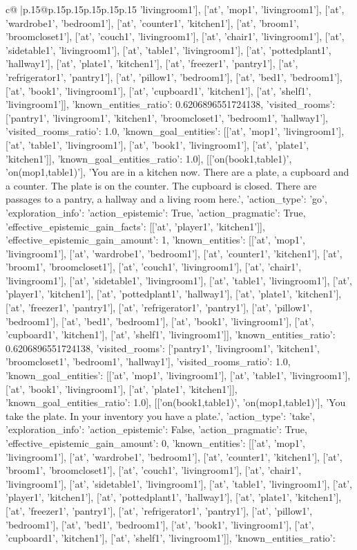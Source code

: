 \documentclass{article}
\begin{document}
{\begin{supertabular}{c@{$\;$}|p{.15\linewidth}@{}p{.15\linewidth}p{.15\linewidth}p{.15\linewidth}p{.15\linewidth}p{.15\linewidth}}
{{{'livingroom1'], ['at', 'mop1', 'livingroom1'], ['at', 'wardrobe1', 'bedroom1'], ['at', 'counter1', 'kitchen1'], ['at', 'broom1', 'broomcloset1'], ['at', 'couch1', 'livingroom1'], ['at', 'chair1', 'livingroom1'], ['at', 'sidetable1', 'livingroom1'], ['at', 'table1', 'livingroom1'], ['at', 'pottedplant1', 'hallway1'], ['at', 'plate1', 'kitchen1'], ['at', 'freezer1', 'pantry1'], ['at', 'refrigerator1', 'pantry1'], ['at', 'pillow1', 'bedroom1'], ['at', 'bed1', 'bedroom1'], ['at', 'book1', 'livingroom1'], ['at', 'cupboard1', 'kitchen1'], ['at', 'shelf1', 'livingroom1']], 'known_entities_ratio': 0.6206896551724138, 'visited_rooms': ['pantry1', 'livingroom1', 'kitchen1', 'broomcloset1', 'bedroom1', 'hallway1'], 'visited_rooms_ratio': 1.0, 'known_goal_entities': [['at', 'mop1', 'livingroom1'], ['at', 'table1', 'livingroom1'], ['at', 'book1', 'livingroom1'], ['at', 'plate1', 'kitchen1']], 'known_goal_entities_ratio': 1.0}}], [['on(book1,table1)', 'on(mop1,table1)'], 'You are in a kitchen now. There are a plate, a cupboard and a counter. The plate is on the counter. The cupboard is closed. There are passages to a pantry, a hallway and a living room here.', {'action_type': 'go', 'exploration_info': {'action_epistemic': True, 'action_pragmatic': True, 'effective_epistemic_gain_facts': [['at', 'player1', 'kitchen1']], 'effective_epistemic_gain_amount': 1, 'known_entities': [['at', 'mop1', 'livingroom1'], ['at', 'wardrobe1', 'bedroom1'], ['at', 'counter1', 'kitchen1'], ['at', 'broom1', 'broomcloset1'], ['at', 'couch1', 'livingroom1'], ['at', 'chair1', 'livingroom1'], ['at', 'sidetable1', 'livingroom1'], ['at', 'table1', 'livingroom1'], ['at', 'player1', 'kitchen1'], ['at', 'pottedplant1', 'hallway1'], ['at', 'plate1', 'kitchen1'], ['at', 'freezer1', 'pantry1'], ['at', 'refrigerator1', 'pantry1'], ['at', 'pillow1', 'bedroom1'], ['at', 'bed1', 'bedroom1'], ['at', 'book1', 'livingroom1'], ['at', 'cupboard1', 'kitchen1'], ['at', 'shelf1', 'livingroom1']], 'known_entities_ratio': 0.6206896551724138, 'visited_rooms': ['pantry1', 'livingroom1', 'kitchen1', 'broomcloset1', 'bedroom1', 'hallway1'], 'visited_rooms_ratio': 1.0, 'known_goal_entities': [['at', 'mop1', 'livingroom1'], ['at', 'table1', 'livingroom1'], ['at', 'book1', 'livingroom1'], ['at', 'plate1', 'kitchen1']], 'known_goal_entities_ratio': 1.0}}], [['on(book1,table1)', 'on(mop1,table1)'], 'You take the plate. In your inventory you have a plate.', {'action_type': 'take', 'exploration_info': {'action_epistemic': False, 'action_pragmatic': True, 'effective_epistemic_gain_amount': 0, 'known_entities': [['at', 'mop1', 'livingroom1'], ['at', 'wardrobe1', 'bedroom1'], ['at', 'counter1', 'kitchen1'], ['at', 'broom1', 'broomcloset1'], ['at', 'couch1', 'livingroom1'], ['at', 'chair1', 'livingroom1'], ['at', 'sidetable1', 'livingroom1'], ['at', 'table1', 'livingroom1'], ['at', 'player1', 'kitchen1'], ['at', 'pottedplant1', 'hallway1'], ['at', 'plate1', 'kitchen1'], ['at', 'freezer1', 'pantry1'], ['at', 'refrigerator1', 'pantry1'], ['at', 'pillow1', 'bedroom1'], ['at', 'bed1', 'bedroom1'], ['at', 'book1', 'livingroom1'], ['at', 'cupboard1', 'kitchen1'], ['at', 'shelf1', 'livingroom1']], 'known_entities_ratio': }}}
\end{supertabular}}
\end{document}
